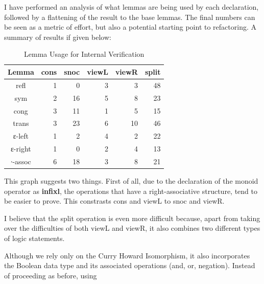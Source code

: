 \documentclass[12pt,twoside,notitlepage]{report}
\begin{document}
I have performed an analysis of what lemmas are being used by each declaration, followed by a flattening of the result to the base lemmas. The final numbers can be seen as a metric of effort, but also a potential starting point to refactoring. A summary of results if given below:

\begin{table}[H]
\caption{Lemma Usage for Internal Verification}
\center
\begin{tabular}{c r r r r r}
\hline 
Lemma & cons & snoc & viewL & viewR & split \\
\hline
refl  	&	1	&	0	&	3&	3&  48\\
sym     &	2	&	16	&	5&	8&	23\\
cong   	&	3	&	11	&	1&	5&	15\\
trans  	&	3	&	23	&	6&	10& 46\\
ε-left  &	1	&	2	&	4&	2& 22\\  
ε-right &	1	&	0	&	2&	4& 13\\
∙-assoc &	6	&	18	&	3&	8& 21\\
\hline
\end{tabular}
\end{table} 

This graph suggests two things. First of all, due to the declaration of the monoid operator as \textbf{infixl}, the operations that have a right-associative structure, tend to be easier to prove. This constrasts cons and viewL to snoc and viewR. 

I believe that the split operation is even more difficult because, apart from taking over the difficulties of both viewL and viewR, it also combines two different types of logic statements. 

Although we rely only on the Curry Howard Isomorphism, it also incorporates the Boolean data type and its associated operations (and, or, negation). Instead of proceeding as before, using 
 
\begin{code}
\\
\>[0]\<[2]%
\>[2] \AgdaSymbol{:}     \<%
\\
\>[0]\<[2]%
\>[2] \AgdaSymbol{:}    \AgdaSymbol{(}   \AgdaSymbol{)}\<%
\\
\end{code} 
\end{document}
